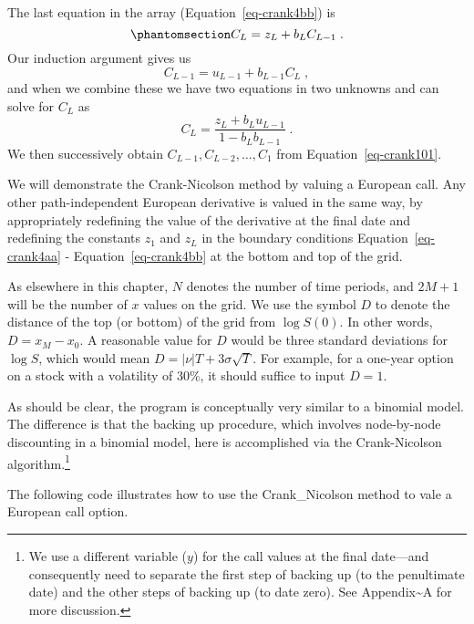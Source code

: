 \documentclass[
  letterpaper,
  DIV=11,
  numbers=noendperiod]{scrartcl}
\theoremstyle{definition}
\theoremstyle{remark}
\begin{document}
The last equation in the array (Equation~\ref{eq-crank4bb}) is
\begin{equation}\phantomsection\label{eq-crankC_L}{
C_L = z_L + b_LC_{L-1}\; .}\end{equation} Our induction argument gives
us \[
C_{L-1} = u_{L-1} + b_{L-1}C_{L}\; ,
\] and when we combine these we have two equations in two unknowns and
can solve for \(C_L\) as \[
C_L = \frac{z_L+ b_Lu_{L-1}}{1-b_Lb_{L-1}}\;.
\] We then successively obtain \(C_{L-1}, C_{L-2}, \ldots, C_1\) from
Equation~\ref{eq-crank101}.

We will demonstrate the Crank-Nicolson method by valuing a European
call. Any other path-independent European derivative is valued in the
same way, by appropriately redefining the value of the derivative at the
final date and redefining the constants \(z_1\) and \(z_L\) in the
boundary conditions Equation~\ref{eq-crank4aa} -
Equation~\ref{eq-crank4bb} at the bottom and top of the grid.

As elsewhere in this chapter, \(N\) denotes the number of time periods,
and \(2M+1\) will be the number of \(x\) values on the grid. We use the
symbol \(D\) to denote the distance of the top (or bottom) of the grid
from \(\log S(0)\). In other words, \(D = x_M-x_0\). A reasonable value
for \(D\) would be three standard deviations for \(\log S\), which would
mean \(D = |\nu|T +3 \sigma\sqrt{T}\). For example, for a one-year
option on a stock with a volatility of 30\%, it should suffice to input
\(D=1\).

As should be clear, the program is conceptually very similar to a
binomial model. The difference is that the backing up procedure, which
involves node-by-node discounting in a binomial model, here is
accomplished via the Crank-Nicolson algorithm.\footnote{We use a
  different variable (\(y\)) for the call values at the final date---and
  consequently need to separate the first step of backing up (to the
  penultimate date) and the other steps of backing up (to date zero).
  See Appendix\textasciitilde A for more discussion.}

The following code illustrates how to use the Crank\_Nicolson method to
vale a European call option.
\end{document}

